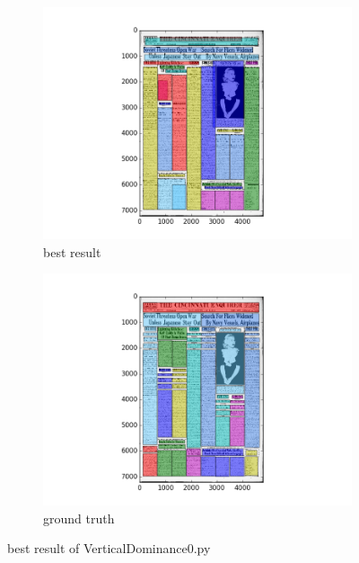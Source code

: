 \documentclass[a4paper,10pt]{article}
\begin{document}
					\begin{figure}
					\centering
					\begin{subfigure}{.5\textwidth}
					  \centering
					  \includegraphics[width=10cm]
					{VerticalDominance0.py.best.png}
					  \caption{best result}
					  \label{fig:sub1}
					\end{subfigure}%
					\begin{subfigure}{.5\textwidth}
					  \centering
					  \includegraphics[width=10cm]
					{VerticalDominance0.py.gt.best.png}
					  \caption{ground truth}
					  \label{fig:sub2}
					\end{subfigure}
					\caption
					{best result of VerticalDominance0.py}
					\label{fig:test}
					\end{figure}
						
\end{document}
